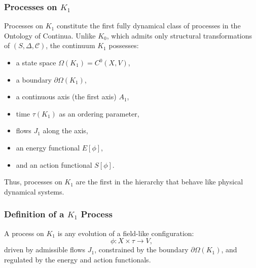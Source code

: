 

\subsubsection{Processes on \texorpdfstring{$K_1$}{K_1}}
\label{sec:processes-k1}

Processes on $K_1$ constitute the first fully dynamical class of processes
in the Ontology of Continua. Unlike $K_0$, which admits only structural
transformations of $(S,\Delta,\mathcal{C})$, the continuum $K_1$ possesses:

\begin{itemize}
    \item a state space $\Omega(K_1) = C^0(X,V)$,
    \item a boundary $\partial\Omega(K_1)$,
    \item a continuous axis (the first axis) $A_1$,
    \item time $\tau(K_1)$ as an ordering parameter,
    \item flows $J_1$ along the axis,
    \item an energy functional $E[\phi]$,
    \item and an action functional $S[\phi]$.
\end{itemize}

Thus, processes on $K_1$ are the first in the hierarchy that behave like
physical dynamical systems.

\subsubsection{Definition of a \texorpdfstring{$K_1$}{K_1} Process}

A process on $K_1$ is any evolution of a field-like configuration:
\[
\phi: X \times \tau \to V,
\]
driven by admissible flows $J_1$, constrained by the boundary
$\partial\Omega(K_1)$, and regulated by the energy and action functionals.

